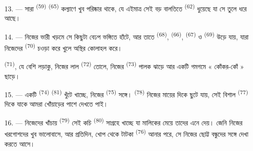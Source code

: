 13. --- সারা  \textsuperscript{(59)} 
\textsuperscript{(65)} কল্যাণে খুব পরিষ্কার থাকে, যে এইমাত্র সেই বড় বালতিতে
 \textsuperscript{(62)} ধুয়েছে যা সে তুলে ধরে আছে।

\VUsaut{3.0mm}
\VUsaut{3.0mm}

14. --- নিজের ভারী খড়মে সে কিছুটা বেঢপ ভঙ্গিতে হাঁটে, আর তাতে
 \textsuperscript{(68)},  \textsuperscript{(66)},
 \textsuperscript{(67)} ও  \textsuperscript{(69)}
উড়ে যায়, যারা নিজেদের  \textsuperscript{(70)} চওড়া করে খুলে
অস্থির কোলাহল করে।

 \textsuperscript{(71)}, যে বেশি লড়াকু, নিজের লাল 
\textsuperscript{(72)} তোলে, নিজের  \textsuperscript{(73)} পালক
ঝাড়ে আর একটি গমগমে « কোঁকর-কোঁ » ছাড়ে।

15. --- একটি  \textsuperscript{(74)} 
\textsuperscript{(81)} খুঁটে খাচ্ছে, নিজের  \textsuperscript{(75)}
সঙ্গে।  \textsuperscript{(78)} নিজের মায়ের দিকে ছুটে যায়,
সেই বিশাল  \textsuperscript{(77)} দিকে যাকে আমরা খোঁয়াড়ের
পাশে দেখতে পাই।

16. --- নিজেদের খাঁচায়  \textsuperscript{(79)} সেই কচি
 \textsuperscript{(80)} সাগ্রহে খাচ্ছে যা মালিকের মেয়ে তাদের এনে
দেয়। জেনি নিজের খরগোশদের খুব ভালোবাসে, আর প্রতিদিন, খোপ থেকে টাটকা
 \textsuperscript{(76)} আনার পরে, সে নিজের ছোট্ট বন্ধুদের সঙ্গে
দেখা করতে আসে।
\VUsaut{6.0mm}
\VUfilet{22mm}
